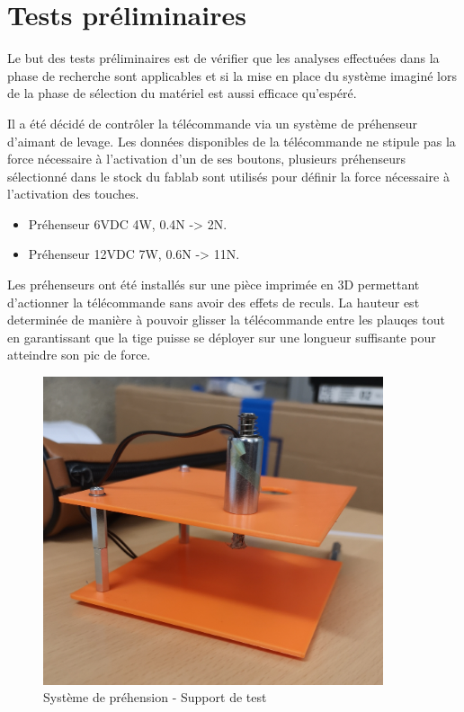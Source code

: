 \section{Tests préliminaires}
Le but des tests préliminaires est de vérifier que les analyses effectuées dans la phase de recherche sont applicables et si la mise en
place du système imaginé lors de la phase de sélection du matériel est aussi efficace qu'espéré.

Il a été décidé de contrôler la télécommande via un système de préhenseur d'aimant de levage. Les données disponibles de la télécommande
ne stipule pas la force nécessaire à l'activation d'un de ses boutons, plusieurs préhenseurs sélectionné dans le stock du \Gls{fablab}
sont utilisés pour définir la force nécessaire à l'activation des touches.

\begin{itemize}
    \item Préhenseur 6VDC 4W, 0.4N -> 2N.
    \item Préhenseur 12VDC 7W, 0.6N -> 11N.
\end{itemize}

Les préhenseurs ont été installés sur une pièce imprimée en 3D permettant d'actionner la télécommande sans avoir des effets de reculs.
La hauteur est determinée de manière à pouvoir glisser la télécommande entre les plauqes tout en garantissant que la tige puisse se déployer sur
une longueur suffisante pour atteindre son pic de force.

\begin{figure}[H]
    \centering
    \includegraphics[width=10cm]{assets/figures/support_test_prehenseur.jpg}
    \caption{Système de préhension - Support de test}
\end{figure}

